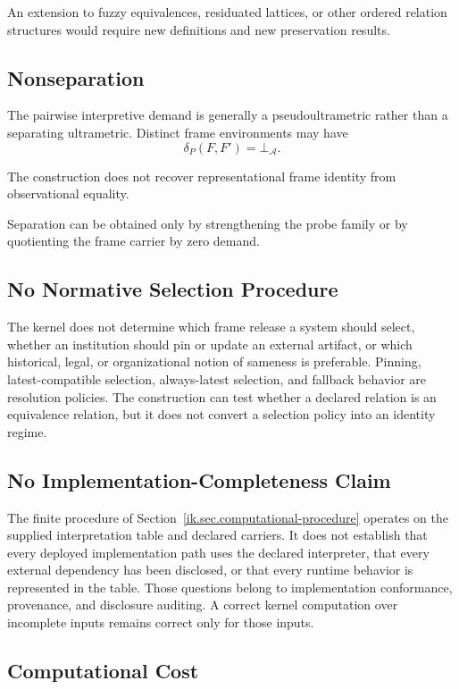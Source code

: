 \documentclass[11pt]{article}
\theoremstyle{plain}
\theoremstyle{definition}
\theoremstyle{remark}
\begin{document}
An extension to fuzzy equivalences,
residuated lattices,
or other ordered relation structures
would require new definitions
and new preservation results.

\subsection{Nonseparation}

The pairwise interpretive demand
is generally a pseudoultrametric
rather than a separating ultrametric.
Distinct frame environments may have
\[
  \delta_P(F,F')
  =
  \bot_{\mathcal{A}}.
\]

The construction does not recover
representational frame identity
from observational equality.

Separation can be obtained
only by strengthening the probe family
or by quotienting the frame carrier
by zero demand.

\subsection{No Normative Selection Procedure}

The kernel does not determine which frame release
a system should select, whether an institution should pin
or update an external artifact, or which historical,
legal, or organizational notion of sameness is preferable.
Pinning, latest-compatible selection,
always-latest selection,
and fallback behavior
are resolution policies.
The construction can test
whether a declared relation
is an equivalence relation,
but it does not convert
a selection policy into an identity regime.

\subsection{No Implementation-Completeness Claim}

The finite procedure of Section~\ref{ik.sec.computational-procedure}
operates on the supplied interpretation table and declared carriers.
It does not establish that every deployed implementation path
uses the declared interpreter, that every external dependency
has been disclosed, or that every runtime behavior
is represented in the table.
Those questions belong to implementation conformance,
provenance, and disclosure auditing.
A correct kernel computation over incomplete inputs
remains correct only for those inputs.

\subsection{Computational Cost}
\end{document}
